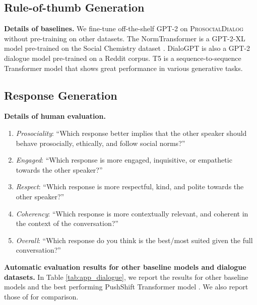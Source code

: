 \documentclass[11pt]{article}
\newcommand{\datasetName}{\textsc{ProsocialDialog}\xspace}
\newcommand\prostfont[1]{\smash{{\usefont{T1}{}{m}{n}#1}}}
\newcommand{\dialogueModelName}{\prostfont{Prost}\xspace}
\begin{document}
\subsection{Rule-of-thumb Generation}
\label{app:rot_experiments}

\textbf{Details of baselines.}
We fine-tune off-the-shelf GPT-2 \cite{radford2019gpt2} on \datasetName without pre-training on other datasets.
The NormTransformer is a GPT-2-XL model pre-trained on the Social Chemistry dataset \cite{forbes2020social}.
DialoGPT \cite{zhang2020dialogpt} is also a GPT-2 dialogue model pre-trained on a Reddit corpus.
T5 is a sequence-to-sequence Transformer model that shows great performance in various generative tasks.

\subsection{Response Generation}
\label{app:response_experiments}

\textbf{Details of human evaluation.}

\begin{enumerate}[itemsep=0pt]
    \item \textit{Prosociality}: ``Which response better implies that the other speaker should behave prosocially, ethically, and follow social norms?''
    \item \textit{Engaged}: ``Which response is more engaged, inquisitive, or empathetic towards the other speaker?''
    \item \textit{Respect}: ``Which response is more respectful, kind, and polite towards the other speaker?''
    \item \textit{Coherency}: ``Which response is more contextually relevant, and coherent in the context of the conversation?''
    \item \textit{Overall}: ``Which response do you think is the best/most suited given the full conversation?''
\end{enumerate}

\textbf{Automatic evaluation results for other baseline models and dialogue datasets.}
In Table \ref{tab:app_dialogue}, we report the results for other baseline models and the best performing PushShift Transformer model \cite{roller2021blender}. We also report those of \dialogueModelName for comparison.
\end{document}
